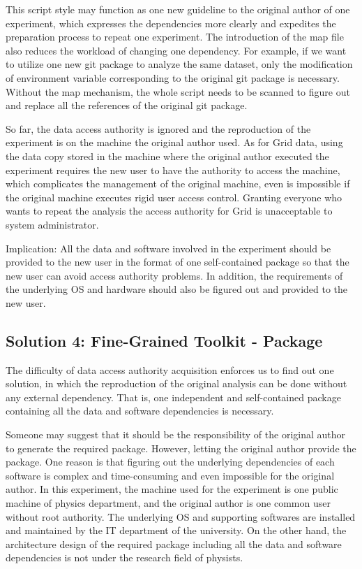 \documentclass{sig-alternate}
\begin{document}
This script style may function as one new guideline to the original author of
one experiment, which expresses the dependencies more clearly and expedites the
preparation process to repeat one experiment. The introduction of the map file
also reduces the workload of changing one dependency. For example, if we want
to utilize one new git package to analyze the same dataset, only the modification of
environment variable corresponding to the original git package is necessary.
Without the map mechanism, the whole script needs to be scanned to figure out and
replace all the references of the original git package.

So far, the data access authority is ignored and
the reproduction of the experiment is on the machine the original author used. 
As for Grid data, using the data
copy stored in the machine where the original author executed the experiment requires the
new user to have the authority to access the machine, which complicates the
management of the original machine, even is impossible if the original machine
executes rigid user access control. Granting everyone who wants to repeat the
analysis the access authority for Grid is unacceptable to system administrator. 

Implication: All the data and software involved in the experiment should be
provided to the new user in the format of one self-contained package so that
the new user can avoid 
access authority problems.
In addition, the requirements of the underlying
OS and hardware should also be figured out and provided to the new user.

\subsection{Solution 4: Fine-Grained Toolkit - Package}
The difficulty of data access authority acquisition enforces us to find out one
solution, in which the reproduction of the original analysis can be done
without any external dependency. That is, one independent and self-contained
package containing all the data and software dependencies is necessary. 

Someone may suggest that it should be the responsibility of the original author
to generate the required package. However, letting the original author provide
the package. 
One reason is that figuring out the underlying dependencies of
each software is complex and time-consuming and even impossible for the
original author. In this experiment, the machine used for the experiment is one
public machine of physics department, and the original author is one common user without
root authority. The underlying OS and supporting softwares are installed and
maintained by the IT department of the university. On the other hand, the
architecture design of the required package including all the data and software
dependencies is not under the research field of physists.
\end{document}
